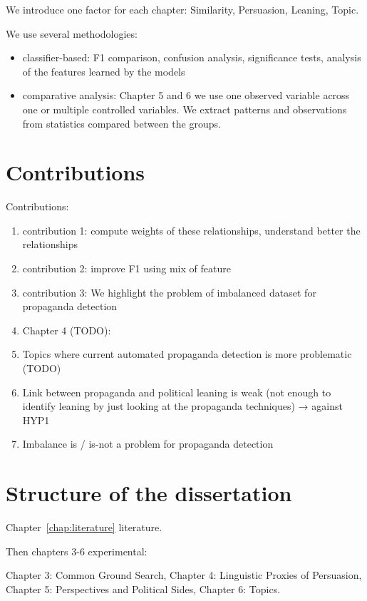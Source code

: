 We introduce one factor for each chapter: Similarity, Persuasion, Leaning, Topic.

We use several methodologies:
\begin{itemize}
    \item classifier-based: F1 comparison, confusion analysis, significance tests, analysis of the features learned by the models 
    \item comparative analysis: Chapter 5 and 6 we use one observed variable across one or multiple controlled variables. We extract patterns and observations from statistics compared between the groups.
\end{itemize}


\section{\statusred Contributions}
\label{sec:intro_contributions}

Contributions:
\begin{enumerate}
    \item contribution 1: compute weights of these relationships, understand better the relationships
    \item contribution 2: improve F1 using mix of feature
    \item contribution 3: We highlight the problem of imbalanced dataset for propaganda detection
    \item Chapter 4 (TODO):
    \item Topics where current automated propaganda detection is more problematic (TODO) 
    \item Link between propaganda and political leaning is weak (not enough to identify leaning by just looking at the propaganda techniques) → against HYP1
    \item Imbalance is / is-not a problem for propaganda detection
\end{enumerate}





\section{\statusred Structure of the dissertation}
\label{sec:intro_structure}

Chapter~\ref{chap:literature} literature.

Then chapters 3-6 experimental:

Chapter 3: Common Ground Search,
Chapter 4: Linguistic Proxies of Persuasion,
Chapter 5: Perspectives and Political Sides,
Chapter 6: Topics.

